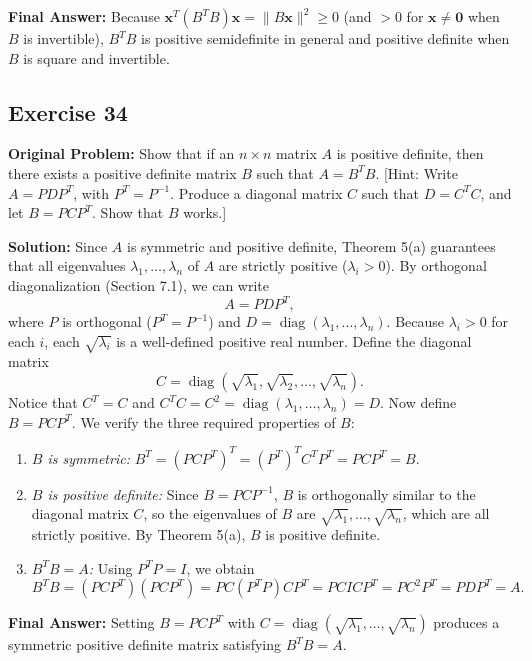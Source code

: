 \documentclass[11pt, letterpaper]{article}
\theoremstyle{definition}
\theoremstyle{remark}
\begin{document}
\textbf{Final Answer:} Because $\mathbf{x}^T (B^T B) \mathbf{x} = \|B\mathbf{x}\|^2 \ge 0$ (and $> 0$ for $\mathbf{x} \ne \mathbf{0}$ when $B$ is invertible), $B^T B$ is positive semidefinite in general and positive definite when $B$ is square and invertible.

\hrulefill

\subsection*{Exercise 34}
\textbf{Original Problem:} Show that if an $n \times n$ matrix $A$ is positive definite, then there exists a positive definite matrix $B$ such that $A = B^T B$. [Hint: Write $A = P D P^T$, with $P^T = P^{-1}$. Produce a diagonal matrix $C$ such that $D = C^T C$, and let $B = P C P^T$. Show that $B$ works.]

\textbf{Solution:}
Since $A$ is symmetric and positive definite, Theorem 5(a) guarantees that all eigenvalues $\lambda_1, \dots, \lambda_n$ of $A$ are strictly positive ($\lambda_i > 0$). By orthogonal diagonalization (Section 7.1), we can write
\[
A = P D P^T,
\]
where $P$ is orthogonal ($P^T = P^{-1}$) and $D = \operatorname{diag}(\lambda_1, \dots, \lambda_n)$. Because $\lambda_i > 0$ for each $i$, each $\sqrt{\lambda_i}$ is a well-defined positive real number. Define the diagonal matrix
\[
C = \operatorname{diag}\left(\sqrt{\lambda_1}, \sqrt{\lambda_2}, \dots, \sqrt{\lambda_n}\right).
\]
Notice that $C^T = C$ and $C^T C = C^2 = \operatorname{diag}(\lambda_1, \dots, \lambda_n) = D$. Now define $B = P C P^T$. We verify the three required properties of $B$:
\begin{enumerate}
    \item \emph{$B$ is symmetric:} $B^T = (P C P^T)^T = (P^T)^T C^T P^T = P C P^T = B$.
    \item \emph{$B$ is positive definite:} Since $B = P C P^{-1}$, $B$ is orthogonally similar to the diagonal matrix $C$, so the eigenvalues of $B$ are $\sqrt{\lambda_1}, \dots, \sqrt{\lambda_n}$, which are all strictly positive. By Theorem 5(a), $B$ is positive definite.
    \item \emph{$B^T B = A$:} Using $P^T P = I$, we obtain
    \[
    B^T B = (P C P^T)(P C P^T) = P C (P^T P) C P^T = P C I C P^T = P C^2 P^T = P D P^T = A.
    \]
\end{enumerate}
\textbf{Final Answer:} Setting $B = P C P^T$ with $C = \operatorname{diag}(\sqrt{\lambda_1}, \dots, \sqrt{\lambda_n})$ produces a symmetric positive definite matrix satisfying $B^T B = A$.
\end{document}
